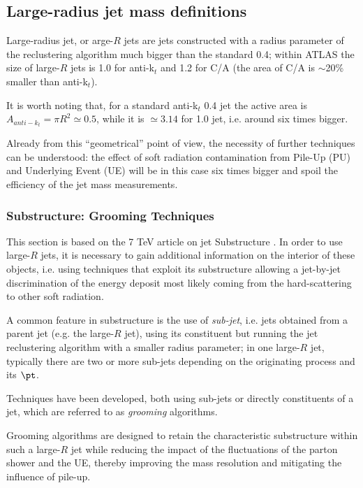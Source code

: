 
\subsection{Large-radius jet mass definitions}

Large-radius jet, or arge-$R$ jets are jets constructed with a radius parameter of the reclustering algorithm much bigger than the standard 0.4; within ATLAS the size of large-$R$ jets is 1.0 for anti-k$_t$ and 1.2 for C/A (the area of C/A is $\sim$20\% smaller than anti-k$_t$).

It is worth noting that, for a standard anti-k$_t$ 0.4 jet the active area \cite{antiktalgo} is $A_{anti-k_t}=\pi R^2 \simeq 0.5$, while it is $\simeq 3.14$ for 1.0 jet, i.e. around six times bigger.

Already from this ``geometrical'' point of view, the necessity of further techniques can be understood: the effect of soft radiation contamination from Pile-Up (PU) and Underlying Event (UE) will be in this case six times bigger and spoil the efficiency of the jet mass measurements.

\subsubsection{Substructure: Grooming Techniques}

This section is based on the 7 TeV article on jet Substructure \cite{substructure1}.
In order to use large-$R$ jets, it is necessary to gain additional information on the interior of these objects, i.e. using techniques that exploit its substructure allowing a jet-by-jet discrimination of the energy deposit most likely coming from the hard-scattering to other soft radiation.

A common feature in substructure is the use of \textit{sub-jet}, i.e. jets obtained from a parent jet (e.g. the large-$R$ jet), using its constituent but running the jet reclustering algorithm with a smaller radius parameter; in one large-$R$ jet, typically there are two or more sub-jets depending on the originating process and its $\pt$.

Techniques have been developed, both using sub-jets or directly constituents of a jet, which are referred to as \textit{grooming} algorithms.

Grooming algorithms are designed to retain the characteristic substructure within such a large-$R$
jet while reducing the impact of the fluctuations of the parton shower and the UE, thereby
improving the mass resolution and mitigating the influence of pile-up.

